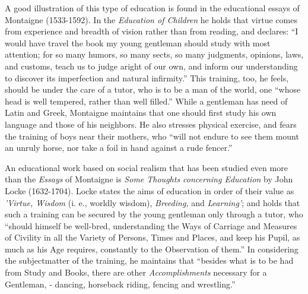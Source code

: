\documentclass[]{book}
\begin{document}
A good illustration of this type of education is found in the educational essays of Montaigne (1533-1592). In the \emph{Education of Children} he holds that virtue comes from experience and breadth of vision rather than from reading, and declares: ``I would have travel the book my young gentleman should study with most attention; for so many humors, so many sects, so many judgments, opinions, laws, and customs, teach us to judge aright of our own, and inform our understanding to discover its imperfection and natural infirmity.'' This training, too, he feels, should be under the care of a tutor, who is to be a man of the world, one ``whose head is well tempered, rather than well filled.'' While a gentleman has need of Latin and Greek, Montaigne maintains that one should first study his own language and those of his neighbors. He also stresses physical exercise, and fears the training of boys near their mothers, who ``will not endure to see them mount an unruly horse, nor take a foil in hand against a rude fencer.''

An educational work based on social realism that has been studied even more than the \emph{Essays} of Montaigne is \emph{Some Thoughts concerning Education} by John Locke (1632-1704). Locke states the aims of education in order of their value as \emph{'Virtue, Wisdom} (i. e., worldly wisdom), \emph{Breeding,} and \emph{Learning'}; and holds that such a training can be secured by the young gentleman only through a tutor, who ``should himself be well-bred, understanding the Ways of Carriage and Measures of Civility in all the Variety of Persons, Times and Places, and keep his Pupil, as much as his Age requires, constantly to the Observation of them.'' In considering the subjectmatter of the training, he maintains that ``besides what is to be had from Study and Books, there are other \emph{Accomplishments} necessary for a Gentleman, - dancing, horseback riding, fencing and wrestling.''
\end{document}

